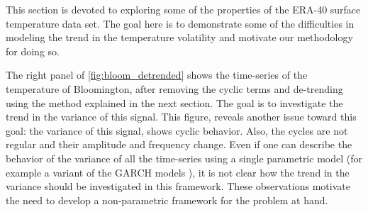 \documentclass{article}
\begin{document}


This section is devoted to exploring some of the properties of the ERA-40 surface temperature data set. The goal here is to demonstrate some of the difficulties in modeling the trend in the temperature volatility and motivate our methodology for doing so.



The right panel of \autoref{fig:bloom_detrended} shows the time-series of the temperature of Bloomington, after removing the cyclic terms and de-trending using the method explained in the next section. The goal is to investigate the trend in the variance of this signal. This figure, reveals another issue toward this goal: the variance of this signal, shows cyclic behavior. Also, the cycles are not regular and their amplitude and frequency change. Even if one can describe the behavior of the variance of all the time-series using a single parametric model (for example a variant of the GARCH models \citep{bollerslev_generalized_1986}), it is not clear how the trend in the variance should be investigated in this framework. These observations motivate the need to develop a non-parametric framework for the problem at hand.
\end{document}
